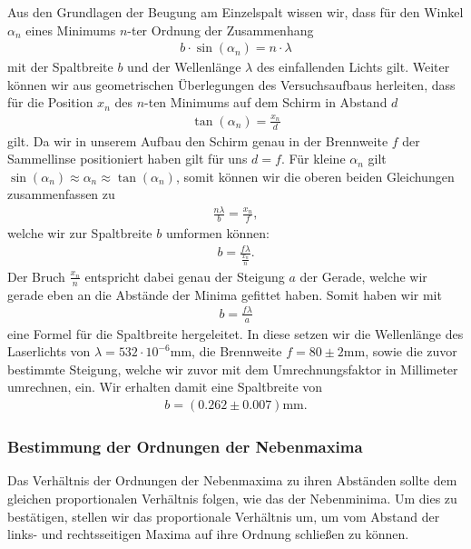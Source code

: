 Aus den Grundlagen der Beugung am Einzelspalt wissen wir, dass für den Winkel $\alpha_n$ eines Minimums $n$-ter Ordnung der Zusammenhang
\begin{align}
  b \cdot \sin(\alpha_n) = n \cdot \lambda
\end{align}
mit der Spaltbreite $b$ und der Wellenlänge $\lambda$ des einfallenden Lichts gilt. Weiter können wir aus geometrischen Überlegungen des Versuchsaufbaus herleiten, dass für die Position $x_n$ des $n$-ten Minimums auf dem Schirm in Abstand $d$
\begin{align}
  \tan(\alpha_n) = \frac{x_n}{d}
\end{align}
gilt. Da wir in unserem Aufbau den Schirm genau in der Brennweite $f$ der Sammellinse positioniert haben gilt für uns $d = f$. Für kleine $\alpha_n$ gilt $\sin(\alpha_n) \approx \alpha_n \approx \tan(\alpha_n)$, somit können wir die oberen beiden Gleichungen zusammenfassen zu
\begin{align}
  \frac{n\lambda}{b} = \frac{x_n}{f},
\end{align}
welche wir zur Spaltbreite $b$ umformen können:
\begin{align}
  b = \frac{f \lambda}{\frac{x_n}{n}}.
\end{align}
Der Bruch $\frac{x_n}{n}$ entspricht dabei genau der Steigung $a$ der Gerade, welche wir gerade eben an die Abstände der Minima gefittet haben. Somit haben wir mit
\begin{align}
  b = \frac{f\lambda}{a}
\end{align}
eine Formel für die Spaltbreite hergeleitet. In diese setzen wir die Wellenlänge des Laserlichts von $\lambda = 532 \cdot 10^{-6} \si{\milli\meter}$, die Brennweite $f = 80 \pm 2 \si{\milli\meter}$, sowie die zuvor bestimmte Steigung, welche wir zuvor mit dem Umrechnungsfaktor in Millimeter umrechnen, ein. Wir erhalten damit eine Spaltbreite von
\begin{align}
  b = (0.262 \pm 0.007)\si{\milli\meter}.
\end{align}

\subsubsection*{Bestimmung der Ordnungen der Nebenmaxima}

Das Verhältnis der Ordnungen der Nebenmaxima zu ihren Abständen sollte dem gleichen proportionalen Verhältnis folgen, wie das der Nebenminima. Um dies zu bestätigen, stellen wir das proportionale Verhältnis um, um vom Abstand der links- und rechtsseitigen Maxima auf ihre Ordnung schließen zu können. 

